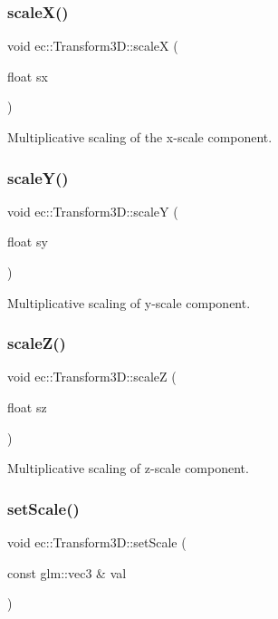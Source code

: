 \subsubsection{\texorpdfstring{scale\+X()}{scaleX()}}
{\footnotesize\ttfamily void ec\+::\+Transform3\+D\+::scaleX (\begin{DoxyParamCaption}\item[{float}]{sx }\end{DoxyParamCaption})}

Multiplicative scaling of the x-\/scale component. \mbox{\label{classec_1_1_transform3_d_a2b15e39c5a79379c361fb515a163c6de}} 
\subsubsection{\texorpdfstring{scale\+Y()}{scaleY()}}
{\footnotesize\ttfamily void ec\+::\+Transform3\+D\+::scaleY (\begin{DoxyParamCaption}\item[{float}]{sy }\end{DoxyParamCaption})}

Multiplicative scaling of y-\/scale component. \mbox{\label{classec_1_1_transform3_d_a61b556423d4c5dffd55f40685b0cb777}} 
\subsubsection{\texorpdfstring{scale\+Z()}{scaleZ()}}
{\footnotesize\ttfamily void ec\+::\+Transform3\+D\+::scaleZ (\begin{DoxyParamCaption}\item[{float}]{sz }\end{DoxyParamCaption})}

Multiplicative scaling of z-\/scale component. \mbox{\label{classec_1_1_transform3_d_af8c2d1832acc0b0b52e217de4efa4d91}} 
\subsubsection{\texorpdfstring{set\+Scale()}{setScale()}\hspace{0.1cm}{\footnotesize\ttfamily [1/2]}}
{\footnotesize\ttfamily void ec\+::\+Transform3\+D\+::set\+Scale (\begin{DoxyParamCaption}\item[{const glm\+::vec3 \&}]{val }\end{DoxyParamCaption})}

